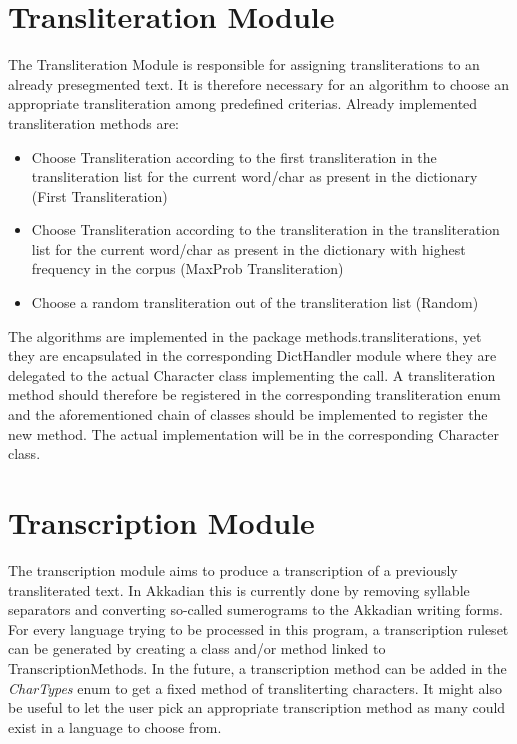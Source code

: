 \documentclass[10pt,a4paper,titlepage]{report}
\begin{document}
	\section{Transliteration Module}
	\label{sec:translitModule}
	The Transliteration Module is responsible for assigning transliterations to an already presegmented text. It is therefore necessary for an algorithm to choose an appropriate transliteration among predefined criterias. Already implemented transliteration methods are:
	\begin{itemize}
		\item Choose Transliteration according to the first transliteration in the transliteration list for the current word/char as present in the dictionary (First Transliteration)
		\item Choose Transliteration according to the transliteration in the transliteration list for the current word/char as present in the dictionary with highest frequency in the corpus (MaxProb Transliteration)
		\item Choose a random transliteration out of the transliteration list (Random)
	\end{itemize}
	The algorithms are implemented in the package methods.transliterations, yet they are encapsulated in the corresponding DictHandler module where they are delegated to the actual Character class implementing the call. A transliteration method should therefore be registered in the corresponding transliteration enum and the aforementioned chain of classes should be implemented to register the new method. The actual implementation will be in the corresponding Character class.
	\section{Transcription Module}
	\label{sec:TranscritionModule}
	The transcription module aims to produce a transcription of a previously transliterated text. In Akkadian this is currently done by removing syllable separators and converting so-called sumerograms to the Akkadian writing forms. For every language trying to be processed in this program, a transcription ruleset can be generated by creating a class and/or method linked to TranscriptionMethods. In the future, a transcription method can be added in the \textit{CharTypes} enum to get a fixed method of transliterting characters. It might also be useful to let the user pick an appropriate transcription method as many could exist in a language to choose from.
\end{document}
